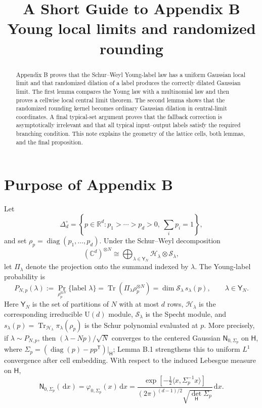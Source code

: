 \documentclass[11pt]{article}
\title{A Short Guide to Appendix B\\
\large Young local limits and randomized rounding}
\author{}
\date{}
\newcommand{\R}{\mathbb R}
\newcommand{\dd}{\,\mathrm d}
\newcommand{\diag}{\operatorname{diag}}
\begin{document}
\maketitle

\begin{abstract}
Appendix B proves that the Schur--Weyl Young-label law has a uniform Gaussian
local limit and that randomized dilation of a label produces the correctly
dilated Gaussian limit.  The first lemma compares the Young law with a
multinomial law and then proves a cellwise local central limit theorem.  The
second lemma shows that the randomized rounding kernel becomes ordinary
Gaussian dilation in central-limit coordinates.  A final typical-set
argument proves that the fallback correction is asymptotically irrelevant
and that all typical input--output labels satisfy the required branching
condition.  This note explains the geometry of the lattice cells, both
lemmas, and the final proposition.
\end{abstract}

\section{Purpose of Appendix B}

Let
\[
  \Delta_d^\circ
  =\left\{p\in\R^d:p_1>\cdots>p_d>0,
    \ \sum_i p_i=1\right\},
\]
and set $\rho_p=\diag(p_1,\ldots,p_d)$.  Under the Schur--Weyl decomposition
\[
  (\mathbb C^d)^{\otimes N}
  \cong\bigoplus_{\lambda\in\mathsf Y_N}
  \mathcal H_\lambda\otimes\mathcal S_\lambda,
\]
let $\Pi_\lambda$ denote the projection onto the summand indexed by
$\lambda$.  The Young-label probability is
\[
  P_{N,p}(\lambda)
  :=\Pr_{\rho_p^{\otimes N}}\{\text{label }\lambda\}
  =\operatorname{Tr}(\Pi_\lambda\rho_p^{\otimes N})
  =\dim\mathcal S_\lambda\,s_\lambda(p),
  \qquad \lambda\in\mathsf Y_N.
\]
Here $\mathsf Y_N$ is the set of partitions of $N$ with at most $d$ rows,
$\mathcal H_\lambda$ is the corresponding irreducible $\mathrm U(d)$
module, $\mathcal S_\lambda$ is the Specht module, and
$s_\lambda(p)=\operatorname{Tr}_{\mathcal H_\lambda}
\pi_\lambda(\rho_p)$ is the Schur polynomial evaluated at $p$.
More precisely, if $\lambda\sim P_{N,p}$, then
$(\lambda-Np)/\sqrt N$ converges to the centered Gaussian
$\mathsf N_{0,\Sigma_p}$ on $\mathsf H$, where
$\Sigma_p=(\diag(p)-pp^{\mathsf T})|_{\mathsf H}$; Lemma B.1 strengthens
this to uniform $L^1$ convergence after cell embedding.
With respect to the induced Lebesgue measure on $\mathsf H$,
\[
  \mathsf N_{0,\Sigma_p}(\dd x)
  =\varphi_{0,\Sigma_p}(x)\dd x
  =\frac{\exp\!\left[-\tfrac12
    \langle x,\Sigma_p^{-1}x\rangle\right]}
  {(2\pi)^{(d-1)/2}\sqrt{\det_{\mathsf H}\Sigma_p}}\dd x.
\]
\end{document}
